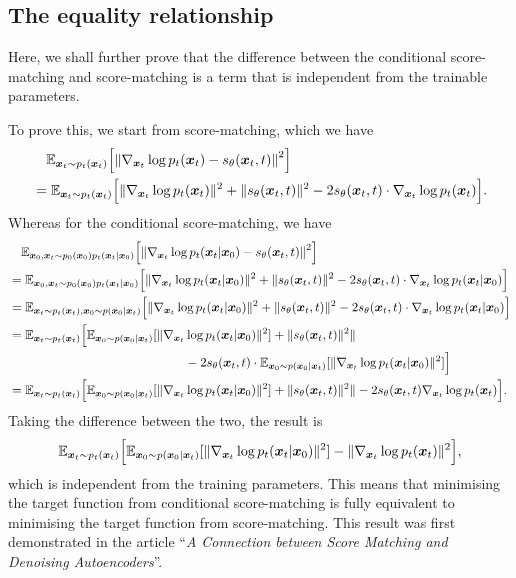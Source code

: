 \subsection{The equality relationship}

Here, we shall further prove that the difference between the conditional score-matching and score-matching is a term that is independent from the trainable parameters.

To prove this, we start from score-matching, which we have 
\begin{align}
    &\quad \mathbb{E}_{\bm{x}_{t}\sim p_t(\bm{x}_{t})}\Bigl[\left\| \nabla_{\bm{x}_{t}}\log p_{t}(\bm{x}_{t})-s_{\theta}(\bm{x}_{t},t) \right\|^2 \Bigr]\nonumber\\
    &=\mathbb{E}_{\bm{x}_{t}\sim p_t(\bm{x}_{t})}\Bigl[ \|\nabla_{\bm{x}_{t}}\log p_{t}(\bm{x}_{t})\|^2 +\|s_{\theta}(\bm{x}_{t},t) \|^2 -2s_{\theta}(\bm{x}_{t},t) \cdot \nabla_{\bm{x}_{t}}\log p_{t}(\bm{x}_{t})\Bigr].\label{eq:18.7}
\end{align}
Whereas for the conditional score-matching, we have 
\begin{align}
   &\quad  \mathbb{E}_{\bm{x}_0,\bm{x}_{t}\sim p_0(\bm{x}_0)p_t(\bm{x}_{t}|\bm{x}_0)} \Bigl[\left\| \nabla_{\bm{x}_{t}}\log p_{t}(\bm{x}_{t}|\bm{x}_0)-s_{\theta}(\bm{x}_{t},t) \right\|^2 \Bigr]\nonumber \\
   &=\mathbb{E}_{\bm{x}_0,\bm{x}_{t}\sim p_0(\bm{x}_0)p_t(\bm{x}_{t}|\bm{x}_0)} 
   \Bigl[ \|\nabla_{\bm{x}_{t}}\log p_{t}(\bm{x}_{t}|\bm{x}_0)\|^2+ \|s_{\theta}(\bm{x}_{t},t)\|^2 -2 s_{\theta}(\bm{x}_{t},t)\cdot \nabla_{\bm{x}_{t}}\log p_{t}(\bm{x}_{t}|\bm{x}_0) \Bigr] \label{eq:18.8}
   \\
   &=\mathbb{E}_{\bm{x}_{t}\sim p_t(\bm{x}_{t}),\bm{x}_0\sim p(\bm{x}_0|\bm{x}_{t})} \Bigl[ \|\nabla_{\bm{x}_{t}}\log p_{t}(\bm{x}_{t}|\bm{x}_0)\|^2+ \|s_{\theta}(\bm{x}_{t},t)\|^2 -2 s_{\theta}(\bm{x}_{t},t)\cdot \nabla_{\bm{x}_{t}}\log p_{t}(\bm{x}_{t}|\bm{x}_0) \Bigr]\nonumber \\
   &=\mathbb{E}_{\bm{x}_{t}\sim p_t(\bm{x}_{t})}\Bigl[ \mathbb{E}_{\bm{x}_0\sim p(\bm{x}_0|\bm{x}_{t})}[\|\nabla_{\bm{x}_{t}}\log p_t(\bm{x}_{t}|\bm{x}_0)\|^2]+ \|s_\theta (\bm{x}_{t},t)\|^2\| \nonumber\\
   &\qquad\qquad\qquad\qquad\qquad\qquad\qquad -2s_\theta (\bm{x}_{t},t)\cdot \mathbb{E}_{\bm{x}_0\sim p(\bm{x}_0|\bm{x}_{t})}[\|\nabla_{\bm{x}_{t}}\log p_t(\bm{x}_{t}|\bm{x}_0)\|^2]\Bigr] \nonumber\\
   &=\mathbb{E}_{\bm{x}_{t}\sim p_t(\bm{x}_{t})}\Bigl[ \mathbb{E}_{\bm{x}_0\sim p(\bm{x}_0|\bm{x}_{t})}[\|\nabla_{\bm{x}_{t}}\log p_t(\bm{x}_{t}|\bm{x}_0)\|^2]+ \|s_\theta (\bm{x}_{t},t)\|^2\| - 2s_\theta (\bm{x}_{t},t) \nabla_{\bm{x}_{t}}\log p_t(\bm{x}_{t}) \Bigr].\nonumber
\end{align}
Taking the difference between the two, the result is 
\begin{equation}
    \label{eq:18.9}
    \mathbb{E}_{\bm{x}_{t}\sim p_t(\bm{x}_{t})}\Bigl[ \mathbb{E}_{\bm{x}_0\sim p(\bm{x}_0|\bm{x}_{t})}[\|\nabla_{\bm{x}_{t}}\log p_t(\bm{x}_{t}|\bm{x}_0)\|^2] - \|\nabla_{\bm{x}_{t}}\log p_{t}(\bm{x}_{t})\|^2\Bigr],
\end{equation}
which is independent from the training parameters. This means that minimising the target function  from conditional score-matching is fully equivalent to minimising the target function from score-matching. This result was first demonstrated in the article ``\emph{A Connection between Score Matching and Denoising Autoencoders}''\cite{vincent2011connection}.

